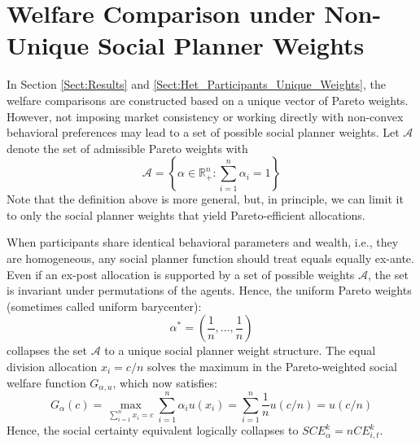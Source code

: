 \section{Welfare Comparison under Non-Unique Social Planner Weights}
\label{Sect:Non-Unique_Weights}
In Section \ref{Sect:Results} and \ref{Sect:Het_Participants_Unique_Weights}, the welfare comparisons are constructed based on a unique vector of Pareto weights. However, not imposing market consistency or working directly with non-convex behavioral preferences may lead to a set of possible social planner weights. Let $\mathcal{A}$ denote the set of admissible Pareto weights with
\begin{equation*}
    \mathcal{A} = \left\{ \alpha \in \mathbb{R}_{+}^n : \sum_{i=1}^n \alpha_i = 1 \right\}
\end{equation*}
Note that the definition above is more general, but, in principle, we can limit it to only the social planner weights that yield Pareto-efficient allocations.

When participants share identical behavioral parameters and wealth, i.e., they are homogeneous, any social planner function should treat equals equally ex-ante. Even if an ex-post allocation is supported by a set of possible weights $\mathcal{A}$, the set is invariant under permutations of the agents. Hence, the uniform Pareto weights (sometimes called uniform barycenter):
\begin{equation*}
    \alpha^* = \left( \frac{1}{n}, \dots, \frac{1}{n} \right)
\end{equation*}
collapses the set $\mathcal{A}$ to a unique social planner weight structure. The equal division allocation $x_i = c/n$ solves the maximum in the Pareto-weighted social welfare function $G_{\alpha, u}$, which now satisfies:
\begin{equation*}
    G_{\alpha}(c) = \max_{\sum_{i=1}^n x_i = c} \sum_{i=1}^n \alpha_i u(x_i) = \sum_{i=1}^n \frac{1}{n} u(c/n) = u(c/n)
\end{equation*}
Hence, the social certainty equivalent logically collapses to $SCE_{\alpha}^k = n CE_{i,t}^k$.

